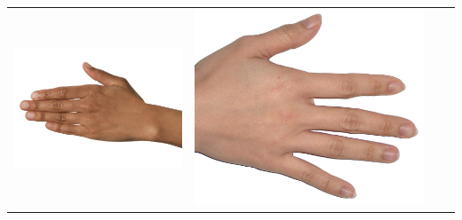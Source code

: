 \begin{longtable}{|c||c|c|c|}
\begin{minipage}{.29\textwidth}
    \includegraphics[width=\textwidth,height=\textheight,keepaspectratio]{../inputs/hand_brown.jpg}
  \end{minipage} & 
  \begin{minipage}{.29\textwidth}
    \includegraphics[width=\textwidth,height=\textheight,keepaspectratio]{../inputs/hand_light.jpg}
  \end{minipage} & 
  \begin{minipage}{.29\textwidth}

\end{minipage}
\end{longtable}

